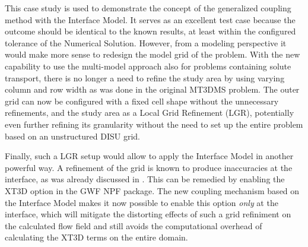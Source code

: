 This case study is used to demonstrate the concept of the generalized coupling method with the Interface Model. It serves as an excellent test case because the outcome should be identical to the known results, at least within the configured tolerance of the Numerical Solution. However, from a modeling perspective it would make more sense to redesign the model grid of the problem. With the new capability to use the multi-model approach also for problems containing solute transport, there is no longer a need to refine the study area by using varying column and row width as was done in the original MT3DMS problem. The outer grid can now be configured with a fixed cell shape without the unnecessary refinements, and the study area as a Local Grid Refinement (LGR), potentially even further refining its granularity without the need to set up the entire problem based on an unstructured DISU grid. 

Finally, such a LGR setup would allow to apply the Interface Model in another powerful way. A refinement of the grid is known to produce inaccuracies at the interface, as was already discussed in \cite{modflow6xt3d}. This can be remedied by enabling the XT3D option in the GWF NPF package. The new coupling mechanism based on the Interface Model makes it now possible to enable this option \emph{only} at the interface, which will mitigate the distorting effects of such a grid refiniment on the calculated flow field and still avoids the computational overhead of calculating the XT3D terms on the entire domain.

